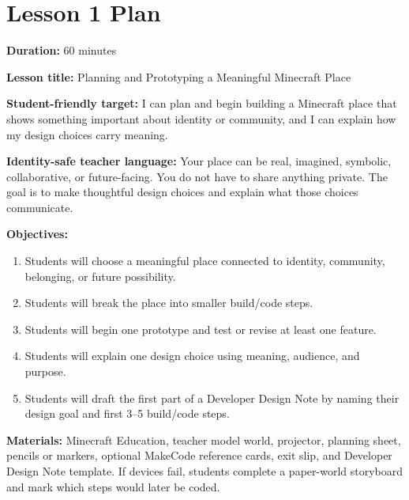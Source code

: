 \newpage
\section*{Lesson 1 Plan}

\textbf{Duration:} 60 minutes

\textbf{Lesson title:} Planning and Prototyping a Meaningful Minecraft Place

\textbf{Student-friendly target:} I can plan and begin building a Minecraft place that shows something important about identity or community, and I can explain how my design choices carry meaning.

\textbf{Identity-safe teacher language:} Your place can be real, imagined, symbolic, collaborative, or future-facing. You do not have to share anything private. The goal is to make thoughtful design choices and explain what those choices communicate.

\textbf{Objectives:}
\begin{enumerate}[leftmargin=*]
    \item Students will choose a meaningful place connected to identity, community, belonging, or future possibility.
    \item Students will break the place into smaller build/code steps.
    \item Students will begin one prototype and test or revise at least one feature.
    \item Students will explain one design choice using meaning, audience, and purpose.
    \item \textcolor{LessonTwoAccent}{Students will draft the first part of a Developer Design Note by naming their design goal and first 3--5 build/code steps.}
\end{enumerate}

\textbf{Materials:} Minecraft Education, teacher model world, projector, planning sheet, pencils or markers, optional MakeCode reference cards, exit slip, and \textcolor{LessonTwoAccent}{Developer Design Note template}. If devices fail, students complete a paper-world storyboard and mark which steps would later be coded.

